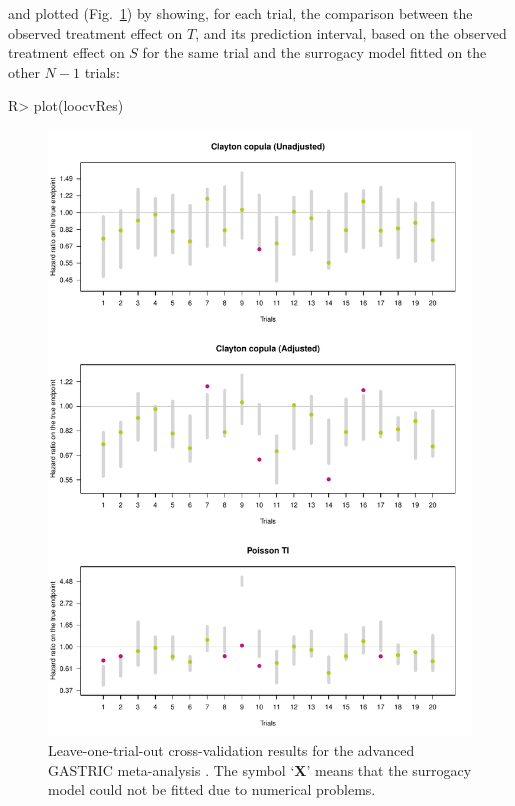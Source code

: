 \documentclass[article,shortnames, nojss]{jss}\usepackage[]{graphicx}\usepackage[]{color}
\begin{document}
and plotted (Fig.~\ref{fig:loocv}) by showing, 
  for each trial, the comparison between the observed 
  treatment effect on $T$, and its prediction interval,
  based on the observed treatment effect on $S$ for the same trial
  and the surrogacy model fitted on the other $N-1$ trials:
\begin{Schunk}
\begin{Sinput}
R>   plot(loocvRes)
\end{Sinput}
\begin{figure}
\includegraphics[width=\textwidth]{figure/loocv-1} \caption{Leave-one-trial-out cross-validation results for the advanced GASTRIC meta-analysis \citep{GASTRIC13}. The symbol `\textbf{X}' means that the surrogacy model could not be fitted due to numerical problems.}\label{fig:loocv}
\end{figure}
\end{Schunk}
\end{document}
